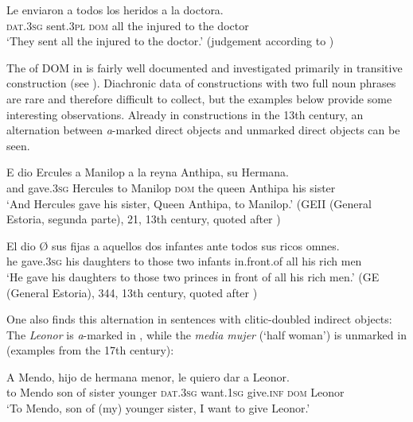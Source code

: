\documentclass[output=paper]{LSP/langsci}
\begin{document}
\ea
\label{11-he-ex:6}
\gll *Le enviaron a todos los heridos a la doctora.\\
\textsc{dat}.\textsc{3sg} sent.\textsc{3pl} \textsc{dom} all the injured to the doctor\\
\glt ‘They sent all the injured to the doctor.’ (judgement according to \citealt[31]{Fabregas2013Differential})
\z

The  of DOM in  is fairly well documented and investigated primarily in transitive construction (see \citealt{Melis1995Objetodirecto,Melisetal2009Interplay,Laca2002Gramaticalizacion,Laca2006Objeto,vonHeusingeretal2007Differential,vonHeusinger2008Verbal}). Diachronic data of  constructions with two full noun phrases are rare and therefore difficult to collect, but the examples below provide some interesting observations. Already in  constructions in the 13th century, an alternation between \textit{a}-marked direct objects  and unmarked direct objects  can be seen.

\ea
\label{11-he-ex:7}
\gll E dio Ercules a Manilop a la reyna Anthipa, su Hermana.\\
and gave.\textsc{3sg} Hercules to Manilop \textsc{dom} the queen Anthipa his sister\\
\glt ‘And Hercules gave his sister, Queen Anthipa, to Manilop.’ (GEII (General Estoria, segunda parte), 21, 13th century, quoted after \citealt[167]{Ortiz2011Construcciones})
\z

\ea
\label{11-he-ex:8}
\gll El dio Ø sus fijas a aquellos dos infantes ante todos sus ricos omnes.\\
he gave.\textsc{3sg} {} his daughters to those two infants in.front.of all his rich men\\
\glt ‘He gave his daughters to those two princes in front of all his rich men.’ (GE (General Estoria), 344, 13th century, quoted after \citealt[168]{Ortiz2011Construcciones})
\z

\largerpage
One also finds this alternation in sentences with clitic-doubled indirect objects: The  \textit{Leonor} is \textit{a}-marked in , while the  \textit{media mujer} (‘half woman’) is unmarked in  (examples from the 17th century):

\ea
\label{11-he-ex:9}
\gll A Mendo, hijo de hermana menor, le quiero dar a Leonor.\\
to Mendo son of sister younger \textsc{dat}.\textsc{3sg} want.\textsc{1sg} give.\textsc{inf} \textsc{dom} Leonor\\
\glt ‘To Mendo, son of (my) younger sister, I want to give Leonor.’ 
\end{document}

